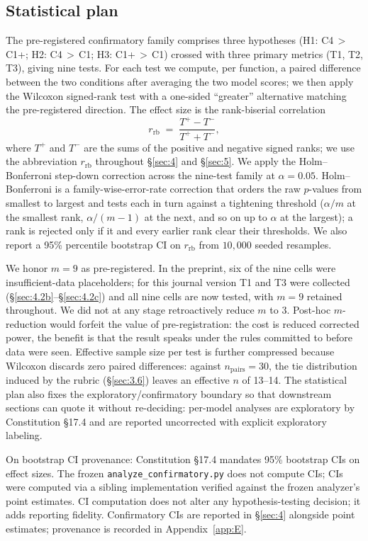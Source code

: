 \documentclass[11pt]{article}
\begin{document}
\subsection{Statistical plan}
\label{sec:3.5}
The pre-registered confirmatory family comprises three hypotheses
(H1: C4\,$>$\,C1+; H2: C4\,$>$\,C1; H3: C1+\,$>$\,C1) crossed with
three primary metrics (T1, T2, T3), giving nine tests. For each test
we compute, per function, a paired difference between the two
conditions after averaging the two model scores; we then apply the
Wilcoxon signed-rank test with a one-sided ``greater'' alternative
matching the pre-registered direction. The effect size is the
rank-biserial correlation
\[
  r_{\text{rb}} \;=\; \frac{T^{+} - T^{-}}{T^{+} + T^{-}},
\]
where $T^{+}$ and $T^{-}$ are the sums of the positive and negative
signed ranks; we use the abbreviation $r_{\text{rb}}$ throughout
\S\ref{sec:4} and \S\ref{sec:5}. We apply the Holm--Bonferroni
step-down correction across the nine-test family at
$\alpha = 0.05$. Holm--Bonferroni is a family-wise-error-rate
correction that orders the raw $p$-values from smallest to largest
and tests each in turn against a tightening threshold
($\alpha/m$ at the smallest rank, $\alpha/(m{-}1)$ at the next, and
so on up to $\alpha$ at the largest); a rank is rejected only if it
and every earlier rank clear their thresholds. We also report a
95\% percentile bootstrap CI on $r_{\text{rb}}$ from
$10{,}000$ seeded resamples.

We honor $m = 9$ as pre-registered. In the preprint, six of the nine
cells were insufficient-data placeholders; for this journal version T1
and T3 were collected (\S\ref{sec:4.2b}--\S\ref{sec:4.2c}) and all
nine cells are now tested, with $m = 9$ retained throughout. We did not
at any stage retroactively reduce $m$ to 3. Post-hoc
$m$-reduction would forfeit the value of pre-registration: the cost
is reduced corrected power, the benefit is that the result speaks
under the rules committed to before data were seen. Effective sample
size per test is further compressed because Wilcoxon discards zero
paired differences: against $n_{\text{pairs}} = 30$, the tie
distribution induced by the rubric (\S\ref{sec:3.6}) leaves an
effective $n$ of 13--14. The statistical plan also fixes the
exploratory/confirmatory boundary so that downstream sections can
quote it without re-deciding: per-model analyses are exploratory
by Constitution \S17.4 and are reported uncorrected with explicit
exploratory labeling.

On bootstrap CI provenance: Constitution \S17.4 mandates 95\%
bootstrap CIs on effect sizes. The frozen
\texttt{analyze\_confirmatory.py} does not compute CIs; CIs were
computed via a sibling implementation verified against the frozen
analyzer's point estimates. CI computation does not alter any
hypothesis-testing decision; it adds reporting fidelity. Confirmatory
CIs are reported in \S\ref{sec:4} alongside point estimates;
provenance is recorded in Appendix~\ref{app:E}.
\end{document}
